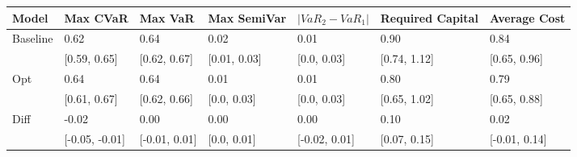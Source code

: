 \begin{tabular}{lllllll}
\toprule
   Model &       Max CVaR &       Max VaR &  Max SemiVar & $|VaR_2 - VaR_1|$ & Required Capital &  Average Cost \\
\midrule
Baseline &           0.62 &          0.64 &         0.02 &              0.01 &             0.90 &          0.84 \\
         &   [0.59, 0.65] &  [0.62, 0.67] & [0.01, 0.03] &       [0.0, 0.03] &     [0.74, 1.12] &  [0.65, 0.96] \\
     Opt &           0.64 &          0.64 &         0.01 &              0.01 &             0.80 &          0.79 \\
         &   [0.61, 0.67] &  [0.62, 0.66] &  [0.0, 0.03] &       [0.0, 0.03] &     [0.65, 1.02] &  [0.65, 0.88] \\
    Diff &          -0.02 &          0.00 &         0.00 &              0.00 &             0.10 &          0.02 \\
         & [-0.05, -0.01] & [-0.01, 0.01] &  [0.0, 0.01] &     [-0.02, 0.01] &     [0.07, 0.15] & [-0.01, 0.14] \\
\bottomrule
\end{tabular}
